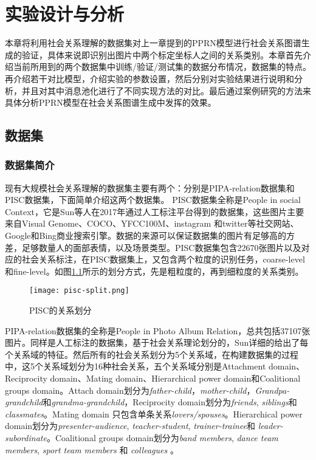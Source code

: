 
\chapter{实验设计与分析}
\label{ch:exp}

本章将利用社会关系理解的数据集对上一章提到的PPRN模型进行社会关系图谱生成的验证，具体来说即识别出图片中两个标定坐标人之间的关系类别。本章首先介绍当前所用到的两个数据集中训练/验证/测试集的数据分布情况，数据集的特点。再介绍若干对比模型，介绍实验的参数设置，然后分别对实验结果进行说明和分析，并且对其中消息池化进行了不同实现方法的对比。最后通过案例研究的方法来具体分析PPRN模型在社会关系图谱生成中发挥的效果。

\section{数据集}

\subsection{数据集简介}

现有大规模社会关系理解的数据集主要有两个：分别是PIPA-relation\cite{sun2017a}数据集和PISC\cite{li2017dual-glance}数据集，下面简单介绍这两个数据集。
PISC数据集全称是People in social Context，它是Sun等人\cite{sun2017a}在2017年通过人工标注平台得到的数据集，这些图片主要来自Visual Genome\cite{krishna2017visual}、COCO\cite{lin2014microsoft}、YFCC100M\cite{thomee2016yfcc100m:}、instagram 和twitter等社交网站、Google和Bing商业搜索引擎。数据的来源可以保证数据集的图片有足够高的方差，足够数量人的面部表情，以及场景类型。PISC数据集包含22670张图片以及对应的社会关系标注，在PISC数据集上，又包含两个粒度的识别任务，coarse-level和fine-level。如图\ref{fig:exp-pisc-r}所示的划分方式，先是粗粒度的，再到细粒度的关系类别。
\begin{figure}[htpb]
	\centering
	\texttt{[image: pisc-split.png]}
    \caption{PISC\cite{li2017dual-glance}的关系划分}
	\vspace*{-3.5mm}
	\label{fig:exp-pisc-r}
\end{figure}

PIPA-relation数据集的全称是People in Photo Album Relation，总共包括37107张图片。同样是人工标注的数据集，基于社会关系理论划分的，Sun\cite{sun2017a}详细的给出了每个关系域的特征。然后所有的社会关系划分为5个关系域，在构建数据集的过程中，这5个关系域划分为16种社会关系，五个关系域分别是Attachment domain、Reciprocity domain、Mating domain、Hierarchical power domain和Coalitional groups domain。Attach domain划分为{\it father-child}，{\it mother-child}，{\it Grandpa-grandchild}和{\it grandma-grandchild}，Reciprocity domain划分为{\it friends}, {\it siblings}和{\it classmates}。Mating domain 只包含单条关系{\it lovers/spouses}。Hierarchical power domain划分为{\it presenter-audience}, {\it teacher-student}, {\it trainer-trainee}和 {\it leader-subordinate}。Coalitional groups domain划分为{\it band members}, {\it dance team members}, {\it sport team members} 和 {\it colleagues} 。

